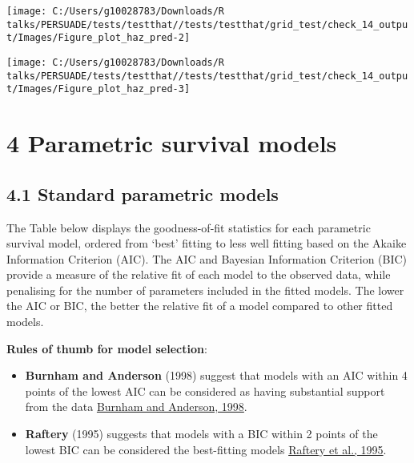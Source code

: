 \documentclass[
]{article}
\providecommand{\tightlist}{%
  \setlength{\itemsep}{0pt}\setlength{\parskip}{0pt}}
\begin{document}
\begin{flushleft}\texttt{[image: C:/Users/g10028783/Downloads/R talks/PERSUADE/tests/testthat//tests/testthat/grid\_test/check\_14\_output/Images/Figure\_plot\_haz\_pred-2]} \end{flushleft}

\begin{flushleft}\texttt{[image: C:/Users/g10028783/Downloads/R talks/PERSUADE/tests/testthat//tests/testthat/grid\_test/check\_14\_output/Images/Figure\_plot\_haz\_pred-3]} \end{flushleft}

\clearpage

\section{4 Parametric survival models}\label{parametric-survival-models}

\subsection{4.1 Standard parametric
models}\label{standard-parametric-models}

The Table below displays the goodness-of-fit statistics for each
parametric survival model, ordered from `best' fitting to less well
fitting based on the Akaike Information Criterion (AIC). The AIC and
Bayesian Information Criterion (BIC) provide a measure of the relative
fit of each model to the observed data, while penalising for the number
of parameters included in the fitted models. The lower the AIC or BIC,
the better the relative fit of a model compared to other fitted models.

\textbf{Rules of thumb for model selection}:

\begin{itemize}
\tightlist
\item
  \textbf{Burnham and Anderson} (1998) suggest that models with an AIC
  within 4 points of the lowest AIC can be considered as having
  substantial support from the data
  \href{https://doi.org/10.1007/978-1-4757-2917-7}{Burnham and Anderson,
  1998}.\\
\item
  \textbf{Raftery} (1995) suggests that models with a BIC within 2
  points of the lowest BIC can be considered the best-fitting models
  \href{https://doi.org/10.2307/271063}{Raftery et al., 1995}.
\end{itemize}
\end{document}
